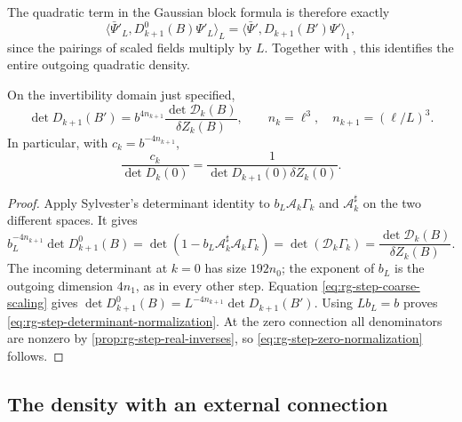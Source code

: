 The quadratic term in the Gaussian block formula is
therefore exactly
\[
 \langle\bar\Psi'_L,D_{k+1}^0(B)\Psi'_L\rangle_L
                         =\langle\bar\Psi',D_{k+1}(B')\Psi'\rangle_1,
\]
since the pairings of scaled fields multiply by $L$.
Together with ,
this identifies the entire outgoing quadratic density.

\begin{proposition}\label{prop:rg-step-determinant-normalization}
On the invertibility domain just specified,
\begin{equation}\label{eq:rg-step-determinant-normalization}
 \det D_{k+1}(B')=
           b^{4n_{k+1}}\frac{\det\mathcal D_k(B)}{\delta Z_k(B)},
 \qquad n_k=\ell^3,\quad n_{k+1}=(\ell/L)^3.
\end{equation}
In particular, with $c_k=b^{-4n_{k+1}}$,
\begin{equation}\label{eq:rg-step-zero-normalization}
 \frac{c_k}{\det D_k(0)}
              =\frac{1}{\det D_{k+1}(0)\delta Z_k(0)}.
\end{equation}
\end{proposition}

\begin{proof}
Apply Sylvester's determinant identity to
$b_L\mathcal A_k\Gamma_k$ and $\mathcal A_k^\sharp$
on the two different spaces. It gives
\[
 b_L^{-4n_{k+1}}\det D_{k+1}^0(B)
       =\det(1-b_L\mathcal A_k^\sharp\mathcal A_k\Gamma_k)
       =\det(\mathcal D_k\Gamma_k)
       =\frac{\det\mathcal D_k(B)}{\delta Z_k(B)}.
\]
The incoming determinant at $k=0$ has size $192n_0$;
the exponent of $b_L$ is the outgoing dimension
$4n_1$, as in every other step.
Equation \eqref{eq:rg-step-coarse-scaling} gives
$\det D_{k+1}^0(B)=L^{-4n_{k+1}}\det D_{k+1}(B')$.
Using $Lb_L=b$ proves
\eqref{eq:rg-step-determinant-normalization}.
At the zero connection all denominators are nonzero
by \cref{prop:rg-step-real-inverses}, so
\eqref{eq:rg-step-zero-normalization} follows.
\end{proof}

\subsection{The density with an external connection}
\label{subsec:rg-step-density}

